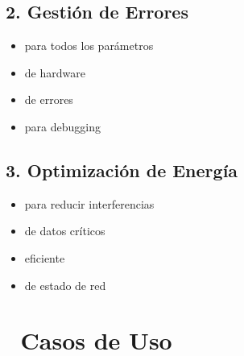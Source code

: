 \documentclass[a4paper,11pt,spanish]{sphinxmanual}
\begin{document}
\section{2. Gestión de Errores}
\label{\detokenize{index:gestion-de-errores}}\begin{itemize}
\item {} 
\sphinxAtStartPar
{} para todos los parámetros

\item {} 
\sphinxAtStartPar
{} de hardware

\item {} 
\sphinxAtStartPar
{} de errores

\item {} 
\sphinxAtStartPar
{} para debugging

\end{itemize}


\section{3. Optimización de Energía}
\label{\detokenize{index:optimizacion-de-energia}}\begin{itemize}
\item {} 
\sphinxAtStartPar
{} para reducir interferencias

\item {} 
\sphinxAtStartPar
{} de datos críticos

\item {} 
\sphinxAtStartPar
{} eficiente

\item {} 
\sphinxAtStartPar
{} de estado de red

\end{itemize}


\chapter{🎯 Casos de Uso}
\label{\detokenize{index:casos-de-uso}}
\end{document}
